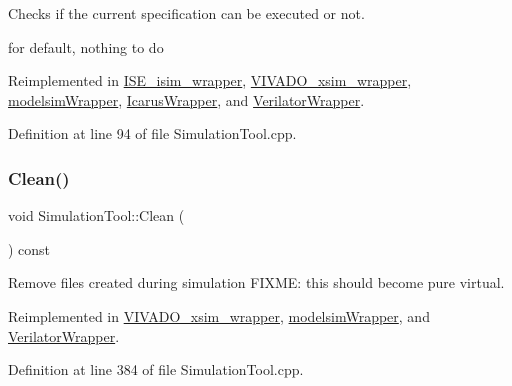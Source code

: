 Checks if the current specification can be executed or not. 

for default, nothing to do 

Reimplemented in \hyperlink{classISE__isim__wrapper_ab7b4139eab5055486945c1547569276f}{I\+S\+E\+\_\+isim\+\_\+wrapper}, \hyperlink{classVIVADO__xsim__wrapper_a92bc3d2006fc9eea8741aae4856e0d75}{V\+I\+V\+A\+D\+O\+\_\+xsim\+\_\+wrapper}, \hyperlink{classmodelsimWrapper_a79d1a35dffbeaa4787958acb7d2632ed}{modelsim\+Wrapper}, \hyperlink{classIcarusWrapper_a9ea8b4abaa701ca7faca32f40ff6c232}{Icarus\+Wrapper}, and \hyperlink{classVerilatorWrapper_ade8f594c94962542008b87f5b0beff70}{Verilator\+Wrapper}.



Definition at line 94 of file Simulation\+Tool.\+cpp.

\mbox{\label{classSimulationTool_a200fbae071dc751132117e922cf8ffc3}} 
\subsubsection{\texorpdfstring{Clean()}{Clean()}}
{\footnotesize\ttfamily void Simulation\+Tool\+::\+Clean (\begin{DoxyParamCaption}{ }\end{DoxyParamCaption}) const\hspace{0.3cm}{\ttfamily [virtual]}}



Remove files created during simulation F\+I\+X\+ME\+: this should become pure virtual. 



Reimplemented in \hyperlink{classVIVADO__xsim__wrapper_ad24840f9dda8644309661c912f37c150}{V\+I\+V\+A\+D\+O\+\_\+xsim\+\_\+wrapper}, \hyperlink{classmodelsimWrapper_a835022e305a7b22a8b62486558cf7542}{modelsim\+Wrapper}, and \hyperlink{classVerilatorWrapper_adfffb92b6facd27a89a6e6999b671ea6}{Verilator\+Wrapper}.



Definition at line 384 of file Simulation\+Tool.\+cpp.

\mbox{\label{classSimulationTool_ac6008e072848fe260c350492afc86076}} 
